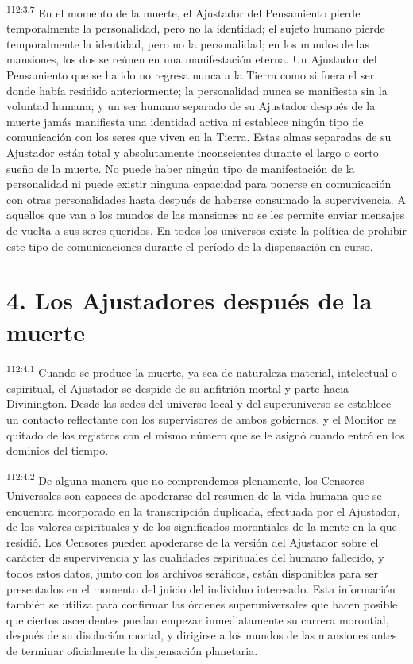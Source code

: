 \par
\textsuperscript{112:3.7} En el momento de la muerte, el Ajustador del Pensamiento pierde temporalmente la personalidad, pero no la identidad; el sujeto humano pierde temporalmente la identidad, pero no la personalidad; en los mundos de las mansiones, los dos se reúnen en una manifestación eterna. Un Ajustador del Pensamiento que se ha ido no regresa nunca a la Tierra como si fuera el ser donde había residido anteriormente; la personalidad nunca se manifiesta sin la voluntad humana; y un ser humano separado de su Ajustador después de la muerte jamás manifiesta una identidad activa ni establece ningún tipo de comunicación con los seres que viven en la Tierra. Estas almas separadas de su Ajustador están total y absolutamente inconscientes durante el largo o corto sueño de la muerte. No puede haber ningún tipo de manifestación de la personalidad ni puede existir ninguna capacidad para ponerse en comunicación con otras personalidades hasta después de haberse consumado la supervivencia. A aquellos que van a los mundos de las mansiones no se les permite enviar mensajes de vuelta a sus seres queridos. En todos los universos existe la política de prohibir este tipo de comunicaciones durante el período de la dispensación en curso.

\section*{4. Los Ajustadores después de la muerte}
\par
\textsuperscript{112:4.1} Cuando se produce la muerte, ya sea de naturaleza material, intelectual o espiritual, el Ajustador se despide de su anfitrión mortal y parte hacia Divinington. Desde las sedes del universo local y del superuniverso se establece un contacto reflectante con los supervisores de ambos gobiernos, y el Monitor es quitado de los registros con el mismo número que se le asignó cuando entró en los dominios del tiempo.

\par
\textsuperscript{112:4.2} De alguna manera que no comprendemos plenamente, los Censores Universales son capaces de apoderarse del resumen de la vida humana que se encuentra incorporado en la transcripción duplicada, efectuada por el Ajustador, de los valores espirituales y de los significados morontiales de la mente en la que residió. Los Censores pueden apoderarse de la versión del Ajustador sobre el carácter de supervivencia y las cualidades espirituales del humano fallecido, y todos estos datos, junto con los archivos seráficos, están disponibles para ser presentados en el momento del juicio del individuo interesado. Esta información también se utiliza para confirmar las órdenes superuniversales que hacen posible que ciertos ascendentes puedan empezar inmediatamente su carrera morontial, después de su disolución mortal, y dirigirse a los mundos de las mansiones antes de terminar oficialmente la dispensación planetaria.


